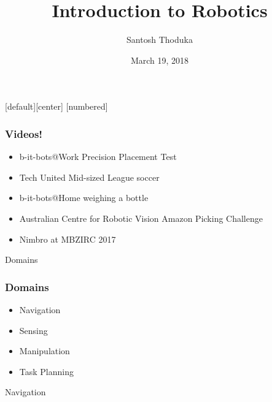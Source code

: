 \documentclass{beamer}
\title[]{Introduction to Robotics}
\author[Santosh Thoduka]{Santosh Thoduka}
\institute[HBRS]{Hochschule Bonn Rhein Sieg}
\date{March 19, 2018}
\begin{document}
[default][center]
[numbered]
\captionsetup[subfigure]{labelformat=empty}

\begin{frame}[plain]
\addtocounter{framenumber}{-1}
\maketitle
\end{frame}

\begin{frame}
\frametitle{Videos!}
\begin{itemize}
\item <1-> b-it-bots@Work Precision Placement Test
\item <2-> Tech United Mid-sized League soccer
\item <3-> b-it-bots@Home weighing a bottle
\item <4-> Australian Centre for Robotic Vision Amazon Picking Challenge
\item <5-> Nimbro at MBZIRC 2017
\end{itemize}

\end{frame}

\begin{frame}[standout]
     Domains
\end{frame}

\begin{frame}
\frametitle{Domains}
\begin{itemize}
    \item Navigation
    \item Sensing
    \item Manipulation
    \item Task Planning
\end{itemize}
\end{frame}

\begin{frame}[standout]
     Navigation
\end{frame}
\end{document}
